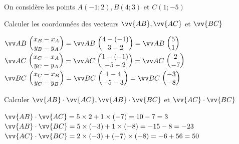\documentclass[a4paper,12pt]{article}        %
\begin{document}
\vspace{-0.3cm}
On considère les points $A(-1 ; 2), B(4 ; 3)$ et $C(1 ;-5)$
\begin{enumMet}
	\item Calculer les coordonnées des vecteurs $\vv{A B}, \vv{A C}$ et $\vv{B C}$
	\begin{corrBox}
		$\Coord{AB}{x_B-x_A}{y_B-y_A}=\Coord{AB}{4-(-1)}{3-2}=\Coord{AB}{5}{1}$ \quad {}\\
		$\Coord{AC}{x_C-x_A}{y_C-y_A}=\Coord{AC}{1-(-1)}{-5-2}=\Coord{AC}{2}{-7}$ \quad {}\\
		$\Coord{BC}{x_C-x_B}{y_C-y_B}=\Coord{BC}{1-4}{-5-3}=\Coord{BC}{-3}{-8}$ \quad {}
	\end{corrBox}
	\item Calculer $\vv{A B} \cdot \vv{A C}, \vv{A B} \cdot \vv{B C}$ et $\vv{A C} \cdot \vv{B C}$
	\begin{corrBox}
		$\vv{A B} \cdot \vv{A C}=5\times2+1\times(-7)=10-7=3$\quad \bareme{0,5}\\
		$\vv{AB} \cdot \vv{BC}=5\times(-3)+1\times(-8)=-15-8=-23$\quad \bareme{0,5}\\
		$\vv{A C} \cdot \vv{BC}=2\times(-3)+(-7)\times(-8)=-6+56=50$\quad \bareme{0,5}
	\end{corrBox}
\end{enumMet}
\end{document}
